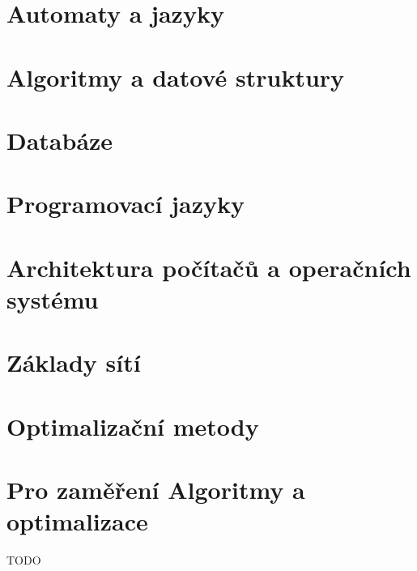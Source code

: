 


\section{Automaty a jazyky}


\section{Algoritmy a datové struktury}


\section{Databáze}


\section{Programovací jazyky}


\section{Architektura počítačů a operačních systému}


\section{Základy sítí}


\section{Optimalizační metody}


\section{Pro zaměření Algoritmy a optimalizace}
TODO

